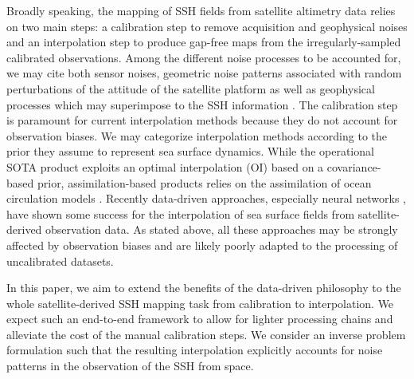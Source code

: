 \documentclass{article}
\begin{document}
Broadly speaking, the mapping of SSH fields from satellite altimetry data relies on two main steps: 
a calibration step to remove acquisition and geophysical noises and an interpolation step to produce gap-free maps from the irregularly-sampled calibrated observations. Among the different noise processes to be accounted for, we may cite both sensor noises, geometric noise patterns associated with random perturbations of the attitude of the satellite platform as well as geophysical processes which may superimpose to the SSH information \cite{swotsciencereq}.
The calibration step is paramount for current interpolation methods because they do not account for observation biases. We may categorize interpolation methods according to the prior they assume to represent sea surface dynamics. While the operational SOTA product \cite{duacs} exploits an optimal interpolation (OI) based on a covariance-based prior, assimilation-based products \cite{glorys} relies on the assimilation of ocean circulation models \cite{le2018ocean}.
Recently data-driven approaches, especially neural networks \cite{joint4dvar}, have shown some success for the interpolation of sea surface fields from satellite-derived observation data. As stated above, all these approaches may be strongly affected by observation biases and are likely poorly adapted to the processing of uncalibrated datasets. 

In this paper, we aim to extend the benefits of the data-driven philosophy to the whole satellite-derived SSH mapping task from calibration to interpolation. We expect such an end-to-end framework to allow for lighter processing chains and alleviate the cost of the manual calibration steps. 
We consider an inverse problem formulation such that the resulting interpolation explicitly accounts for noise patterns in the observation of the SSH from space.
\end{document}
